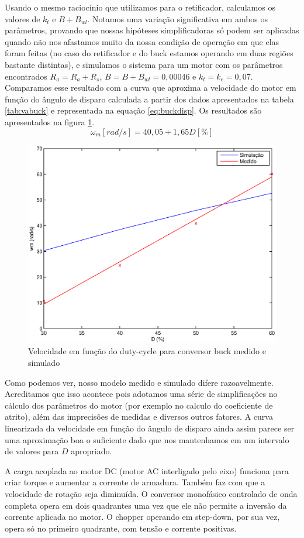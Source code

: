 \documentclass{article}
\begin{document}
Usando o mesmo raciocínio que utilizamos para o retificador, calculamos os valores de $k_t$ e $B + B_{wl}$. Notamos uma variação significativa em ambos os parâmetros, provando que nossas hipóteses simplificadoras só podem ser aplicadas quando não nos afastamos muito da nossa condição de operação em que elas foram feitas (no caso do retificador e do buck estamos operando em duas regiões bastante distintas), e simulamos o sistema para um motor com os parâmetros encontrados $R_a = R_a + R_s$, $B = B + B_{wl} = 0,00046$ e $k_t = k_e = 0,07$.  Comparamos esse resultado com a curva que aproxima a velocidade do motor em função do ângulo de disparo calculada a partir dos dados apresentados na tabela \ref{tab:vabuck} e representada na equação \ref{eq:buckdisp}. Os resultados são apresentados na figura \ref{fig:buckwd}.
\begin{equation}
\omega_m [rad/s] = 40,05 + 1,65 D [\%]
\label{eq:buckdisp}
\end{equation}

\begin{figure} [H]
	\centering
	\includegraphics[width=\linewidth]{Dados/Buck/wd}
	\caption{Velocidade em função do duty-cycle para conversor buck medido e simulado}
	\label{fig:buckwd}
\end{figure}

Como podemos ver, nosso modelo medido e simulado difere razoavelmente. Acreditamos que isso acontece pois adotamos uma série de simplificações no cálculo dos parâmetros do motor (por exemplo no calculo do coeficiente de atrito), além das imprecisões de medidas e diversos outros fatores. A curva linearizada da velocidade em função do ângulo de disparo ainda assim parece ser uma aproximação boa o suficiente dado que nos mantenhamos em um intervalo de valores para $D$ apropriado.

A carga acoplada ao motor DC (motor AC interligado pelo eixo) funciona para criar torque e aumentar a corrente de armadura. Também faz com que a velocidade de rotação seja diminuída.
O conversor monofásico controlado de onda completa opera em dois quadrantes uma vez que ele não permite a inversão da corrente aplicada no motor. O chopper operando em step-down, por sua vez, opera só no primeiro quadrante, com tensão e corrente positivas.
\end{document}
